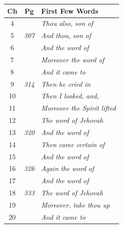\documentclass{article}
\newlength{\minipageheight}
\newlength{\minipagewidth}
\begin{document}
%
% 
\begin{flushright}%
    \begin{minipage}[r][\minipageheight][t]{\minipagewidth}%
        \begin{longtable}{ccl}
            \textbf{Ch} & \textbf{Pg}  & \textbf{First Few Words}            \\%
            \hline%
            \endfirsthead%
            4           &              & \textit{Thou also, son of}          \\
            5           & \textit{307} & \textit{And thou, son of}           \\
            6           &              & \textit{And the word of}            \\
            7           &              & \textit{Moreover the word of}       \\
            8           &              & \textit{And it came to}             \\
            9           & \textit{314} & \textit{Then he cried in}           \\
            10          &              & \textit{Then I looked, and,}        \\
            11          &              & \textit{Moreover the Spirit lifted} \\
            12          &              & \textit{The word of Jehovah}        \\
            13          & \textit{320} & \textit{And the word of}            \\
            14          &              & \textit{Then came certain of}       \\
            15          &              & \textit{And the word of}            \\
            16          & \textit{326} & \textit{Again the word of}          \\
            17          &              & \textit{And the word of}            \\
            18          & \textit{333} & \textit{The word of Jehovah}        \\
            19          &              & \textit{Moreover, take thou up}     \\
            20          &              & \textit{And it came to}             \\

\end{longtable}
\end{minipage}
\end{flushright}
\end{document}
